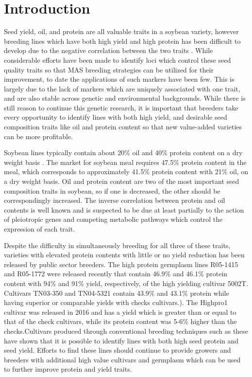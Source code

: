\documentclass[Agronomy,article,submit,moreauthors,pdftex]{mdpi}
\begin{document}

\hypertarget{introduction}{%
\section{Introduction}\label{introduction}}

Seed yield, oil, and protein are all valuable traits in a soybean
variety, however breeding lines which have both high yield and high
protein has been difficult to develop due to the negative correlation
between the two traits
\citep{burton1987quantitative, ProtOilCorr, ProtOilCorr_new}. While
considerable efforts have been made to identify loci which control these
seed quality traits so that MAS breeding strategies can be utilized for
their improvement, to date the applications of such markers have been
few. This is largely due to the lack of markers which are uniquely
associated with one trait, and are also stable across genetic and
environmental backgrounds. While there is still reason to continue this
genetic research, it is important that breeders take every opportunity
to identify lines with both high yield, and desirable seed composition
traits like oil and protein content so that new value-added varieties
can be more profitable.

Soybean lines typically contain about 20\% oil and 40\% protein content
on a dry weight basis \citep{ProteinGenomics}. The market for soybean
meal requires 47.5\% protein content in the meal, which corresponds to
approximately 41.5\% protein content with 21\% oil, on a dry weight
basis\citep{ProteinGenomics}. Oil and protein content are two of the
most important seed composition traits in soybean, so if one is
decreased, the other should be correspondingly increased. The inverse
correlation between protein and oil contents is well known and is
suspected to be due at least partially to the action of pleiotropic
genes and competing metabolic pathways which control the expression of
each trait\citep{SeedCompositionGenomics}.

Despite the difficulty in simultaneously breeding for all three of these
traits, varieties with elevated protein contents with little or no yield
reduction has been released by public sector breeders. The high protein
germplasm lines R05-1415 and R05-1772 were released recently that
contain 46.9\% and 46.1\% protein content with 94\% and 91\% yield,
respectively, of the high yielding cultivar
5002T\citep{HiProtHiYield02}. Cultivars TN03-350 and TN04-5321 contain
43.9\% and 43.1\% protein while having superior or comparable yields
with checks cultivars\citep{HiProtHiYield04}.). The Highpro1 cultivar
was released in 2016 and has a yield which is greater than or equal to
that of the check cultivars, while its protein content was 5-6\% higher
than the checks\citep{HighPro1}.Cultivars produced through conventional
breeding techniques such as these have shown that it is possible to
identify lines with both high seed protein and seed yield. Efforts to
find these lines should continue to provide growers and breeders with
additional high value cultivars and germplasm which can be used to
further improve protein and yield traits.
\end{document}
